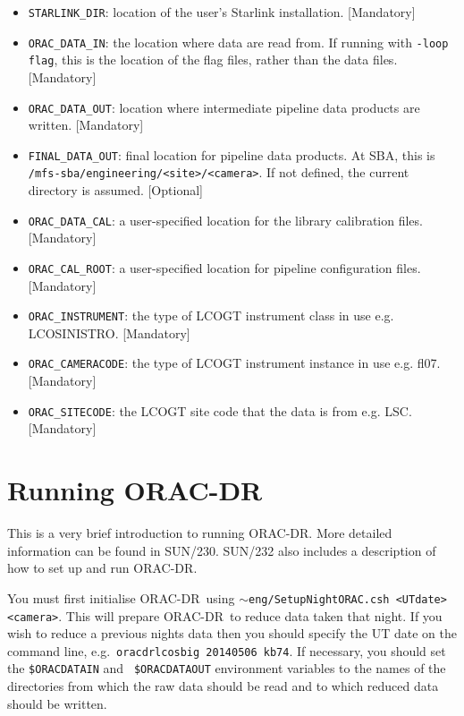 \documentclass[twoside,11pt]{article}
\newcommand{\xref}[3]{#1}
\renewcommand{\_}{\texttt{\symbol{95}}}
\newcommand{\ORACDR}{{\footnotesize ORAC-DR}}
\newcommand{\task}[1]{\textsf{#1}}
\begin{document}
\begin{itemize}

\item \verb+STARLINK_DIR+: location of the user's Starlink
  installation. [Mandatory]

\item \verb+ORAC_DATA_IN+: the location where data are read from. If
  running with \verb+-loop flag+, this is the location of the flag
  files, rather than the data files. [Mandatory]

\item \verb+ORAC_DATA_OUT+: location where intermediate pipeline data products are
  written. [Mandatory]

\item \verb+FINAL_DATA_OUT+: final location for pipeline data products. At SBA,
  this is \\ \verb+/mfs-sba/engineering/<site>/<camera>+. If not defined, the current
  directory is assumed. [Optional]

\item \verb+ORAC_DATA_CAL+: a user-specified location for
  the library calibration files. [Mandatory]

\item \verb+ORAC_CAL_ROOT+: a user-specified location for
  pipeline configuration files. [Mandatory]

\item \verb+ORAC_INSTRUMENT+: the type of LCOGT instrument class in use e.g.
\task{LCOSINISTRO}. [Mandatory]

\item \verb+ORAC_CAMERACODE+: the type of LCOGT instrument instance in use e.g.
\task{fl07}. [Mandatory]

\item \verb+ORAC_SITECODE+: the LCOGT site code that the data is from  e.g.
\task{LSC}. [Mandatory]

\end{itemize}

\section{Running ORAC-DR}

This is a very brief introduction to running \ORACDR. More detailed
information can be found in \xref{SUN/230}{sun230}{}.
\xref{SUN/232}{sun232}{} also includes a description of how to set up
and run \ORACDR.

You must first initialise \ORACDR\ using {\tt $\sim$eng/Setup\_Night\_ORAC.csh
<UTdate> <camera>}. This will
prepare \ORACDR\ to reduce data taken that night. If
you wish to reduce a previous nights data then you should specify the
UT date on the command line, e.g.\ {\tt oracdr\_lcosbig 20140506 kb74}. If
necessary, you should set the {\tt \$ORAC\_DATA\_IN} and {\tt
  \$ORAC\_DATA\_OUT} environment variables to the names of the
directories from which the raw data should be read and to which reduced
data should be written.
\end{document}
